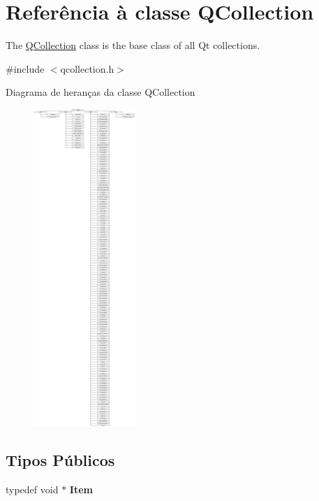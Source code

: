 \hypertarget{class_q_collection}{\section{Referência à classe Q\-Collection}
\label{class_q_collection}
}


The \hyperlink{class_q_collection}{Q\-Collection} class is the base class of all Qt collections.  




{\ttfamily \#include $<$qcollection.\-h$>$}

Diagrama de heranças da classe Q\-Collection\begin{figure}[H]
\begin{center}
\leavevmode
\includegraphics[height=12.000000cm]{class_q_collection}
\end{center}
\end{figure}
\subsection*{Tipos Públicos}
\begin{DoxyCompactItemize}
\item 
\hypertarget{class_q_collection_a827e8fb836ae3e440727586b7ade5957}{typedef void $\ast$ {\bfseries Item}}\label{class_q_collection_a827e8fb836ae3e440727586b7ade5957}

\end{DoxyCompactItemize}
